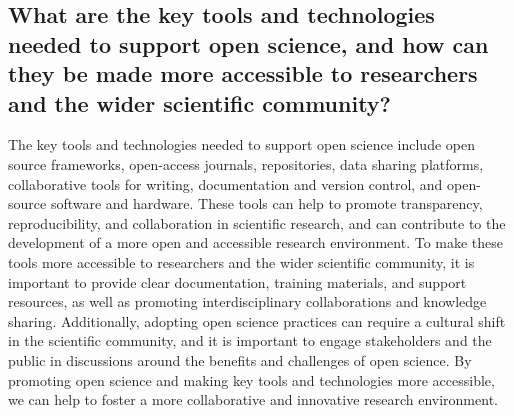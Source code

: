 \subsection{What are the key tools and technologies needed to support open science, and how can they be made more accessible to researchers and the wider scientific community?}
The key tools and technologies needed to support open science include open source frameworks, open-access journals, repositories, data sharing platforms, collaborative tools for writing, documentation and version control, and open-source software and hardware. These tools can help to promote transparency, reproducibility, and collaboration in scientific research, and can contribute to the development of a more open and accessible research environment. To make these tools more accessible to researchers and the wider scientific community, it is important to provide clear documentation, training materials, and support resources, as well as promoting interdisciplinary collaborations and knowledge sharing. Additionally, adopting open science practices can require a cultural shift in the scientific community, and it is important to engage stakeholders and the public in discussions around the benefits and challenges of open science. By promoting open science and making key tools and technologies more accessible, we can help to foster a more collaborative and innovative research environment.
    
